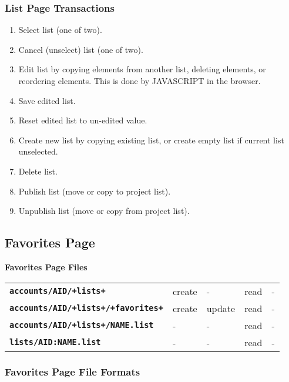 \documentclass[12pt]{article}
\newcommand{\TT}[1]{{\tt \bfseries #1}}
\begin{document}
\subsubsection{List Page Transactions}

\begin{enumerate}
\item Select list (one of two).
\item Cancel (unselect) list (one of two).
\item Edit list by copying elements from another list, deleting elements,
      or reordering elements.  This is done by JAVASCRIPT in the browser.
\item Save edited list.
\item Reset edited list to un-edited value.
\item Create new list by copying existing list, or create empty list
      if current list unselected.
\item Delete list.
\item Publish list (move or copy to project list).
\item Unpublish list (move or copy from project list).
\end{enumerate}

\newpage

\subsection{Favorites Page}

\begin{center}

{\bf Favorites Page Files}

\begin{tabular}{lllll}
\TT{accounts/AID/+lists+}    		& create  & -      & read & - \\
\TT{accounts/AID/+lists+/+favorites+}  	& create  & update & read & - \\
\TT{accounts/AID/+lists+/NAME.list}    	& -       & -      & read & - \\
\TT{lists/AID:NAME.list} 		& -       & -      & read & - \\
\end{tabular}


\end{center}

\subsubsection{Favorites Page File Formats}
\end{document}
